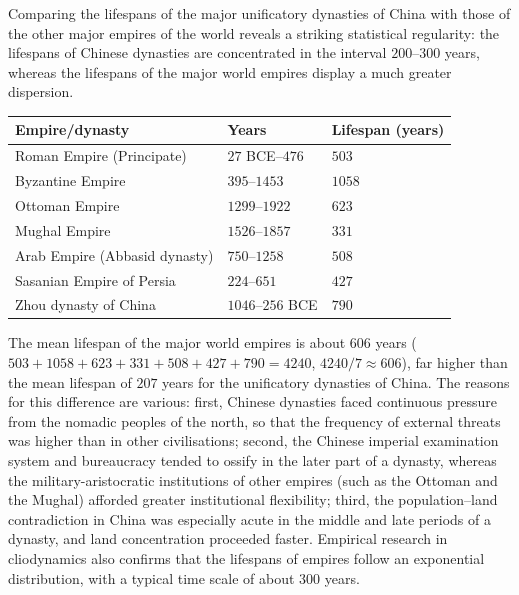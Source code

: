 \begin{remark}\label{rem:dynasty_vs_empires}
Comparing the lifespans of the major unificatory dynasties of China with those of the other major empires of the world reveals a striking statistical regularity: the lifespans of Chinese dynasties are concentrated in the interval $200$--$300$ years, whereas the lifespans of the major world empires display a much greater dispersion.

\begin{center}
\begin{tabular}{>{\centering\arraybackslash}p{3.5cm}>{\centering\arraybackslash}p{2.5cm}>{\centering\arraybackslash}p{2cm}}
\toprule
Empire/dynasty & Years & Lifespan (years) \\
\midrule
Roman Empire (Principate) & $27$ BCE--$476$ & $503$ \\
Byzantine Empire & $395$--$1453$ & $1058$ \\
Ottoman Empire & $1299$--$1922$ & $623$ \\
Mughal Empire & $1526$--$1857$ & $331$ \\
Arab Empire (Abbasid dynasty) & $750$--$1258$ & $508$ \\
Sasanian Empire of Persia & $224$--$651$ & $427$ \\
Zhou dynasty of China & $1046$--$256$ BCE & $790$ \\
\bottomrule
\end{tabular}
\end{center}

The mean lifespan of the major world empires is about $606$ years ($503+1058+623+331+508+427+790=4240$, $4240/7\approx606$), far higher than the mean lifespan of $207$ years for the unificatory dynasties of China. The reasons for this difference are various: first, Chinese dynasties faced continuous pressure from the nomadic peoples of the north, so that the frequency of external threats was higher than in other civilisations; second, the Chinese imperial examination system and bureaucracy tended to ossify in the later part of a dynasty, whereas the military-aristocratic institutions of other empires (such as the Ottoman and the Mughal) afforded greater institutional flexibility; third, the population--land contradiction in China was especially acute in the middle and late periods of a dynasty, and land concentration proceeded faster. Empirical research in cliodynamics also confirms that the lifespans of empires follow an exponential distribution, with a typical time scale of about $300$ years.
\end{remark}

